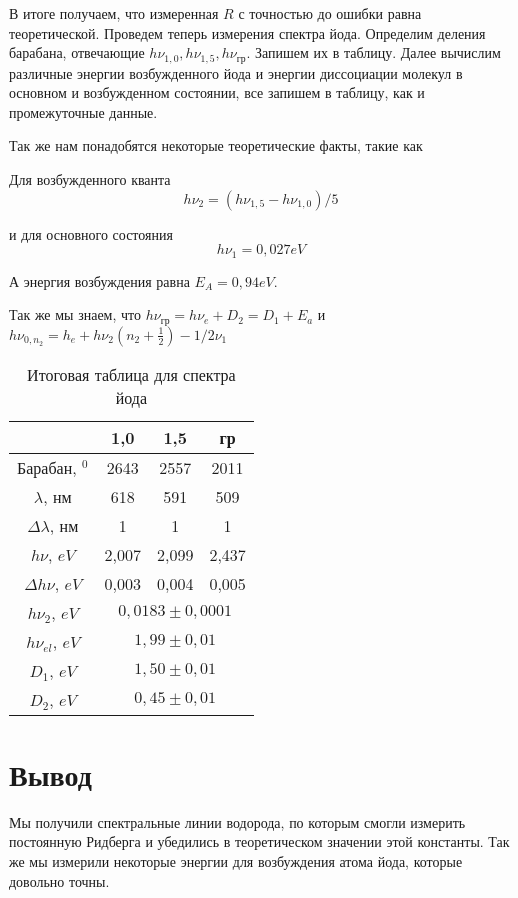 \documentclass[a4paper, 12pt]{article}%
\begin{document}
В итоге получаем, что измеренная $R$ с точностью до ошибки равна теоретической.
\newpage
Проведем теперь измерения спектра йода. Определим деления барабана, отвечающие $h\nu_{1,0}, h\nu_{1,5}, h\nu_{\text{гр}}$. Запишем их в таблицу. Далее вычислим различные энергии возбужденного йода и энергии диссоциации молекул в основном и возбужденном состоянии, все запишем в таблицу, как и промежуточные данные.

Так же нам понадобятся некоторые теоретические факты, такие как

Для возбужденного кванта
\[h\nu_2 = (h\nu_{1,5}-h\nu_{1,0})/5\]

и для основного состояния
\[h\nu_1 = 0,027 eV\]

А энергия возбуждения равна $E_A = 0,94 eV$.

Так же мы знаем, что $h\nu_{\text{гр}} = h\nu_e + D_2 = D_1 + E_a$ и $h\nu_{0,n_2} = h_e + h\nu_2\left(n_2 + \frac{1}{2}\right) - 1/2\nu_1$

\begin{table}[h]
\begin{center}
\begin{tabular}{|c|c|c|c|}
\hline
                    & 1,0          & 1,5         & гр          \\ \hline
Барабан, $^0$       & 2643         & 2557        & 2011        \\ \hline
$\lambda$, нм       & 618          & 591         & 509         \\ \hline
$\Delta\lambda$, нм & 1            & 1           & 1           \\ \hline
$h\nu$, $eV$        & 2,007        & 2,099       & 2,437       \\ \hline
$\Delta h\nu$, $eV$ & 0,003        & 0,004       & 0,005       \\ \hline
$h\nu_2$, $eV$      & \multicolumn{3}{c|}{$0,0183 \pm 0,0001$} \\ \hline
$h\nu_{el}$, $eV$   & \multicolumn{3}{c|}{$1,99\pm 0,01$}      \\ \hline
$D_1$, $eV$         & \multicolumn{3}{c|}{$1,50 \pm 0,01$}     \\ \hline
$D_2$, $eV$         & \multicolumn{3}{c|}{$0,45\pm0,01$}       \\ \hline
\end{tabular}
\caption{Итоговая таблица для спектра йода}
\end{center}
\end{table}
\section*{Вывод}
Мы получили спектральные линии водорода, по которым смогли измерить постоянную Ридберга и убедились в теоретическом значении этой константы. Так же мы измерили некоторые энергии для возбуждения атома йода, которые довольно точны.
\end{document}
